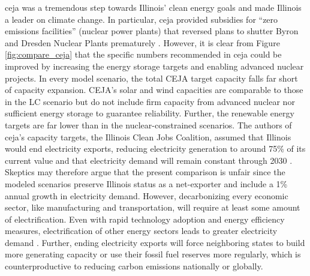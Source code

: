 \gls{ceja} was a tremendous step towards Illinois' clean energy goals and made
Illinois a leader on climate change. In particular, \gls{ceja} provided subsidies
for ``zero emissions facilities'' (nuclear power plants) that reversed plans to
shutter Byron and Dresden Nuclear Plants prematurely \cite{harmon_climate_2021,
brown_two_2021}. However, it is clear from Figure \ref{fig:compare_ceja} that
the specific numbers recommended in \gls{ceja} could be improved by increasing
the energy storage targets and enabling advanced nuclear projects.
In every model scenario, the total CEJA target capacity falls far short of capacity
expansion. CEJA's solar and wind capacities are comparable to those in the \gls{LC}
scenario but do not include firm capacity from advanced nuclear nor sufficient
energy storage to guarantee reliability. Further, the
renewable energy targets are far lower than in the nuclear-constrained scenarios.
The authors of \gls{ceja}'s capacity targets, the Illinois Clean Jobs Coalition,
assumed that Illinois would end electricity exports, reducing electricity generation
to around 75\% of its current value and that electricity demand will remain constant
through 2030 \cite{the_accelerate_group_clean_2019}. Skeptics may therefore argue
that the present comparison is unfair since the modeled scenarios preserve Illinois
status as a net-exporter and include a 1\% annual growth in electricity demand.
However, decarbonizing every economic sector, like manufacturing and
transportation, will require
at least some amount of electrification. Even with rapid technology adoption and
energy efficiency measures, electrification of other energy sectors leads to greater
electricity demand \cite{mai_electrification_2018}. Further, ending electricity
exports will force neighboring states to build more generating capacity or use
their fossil fuel reserves more regularly, which is counterproductive to reducing
carbon emissions nationally or globally.

